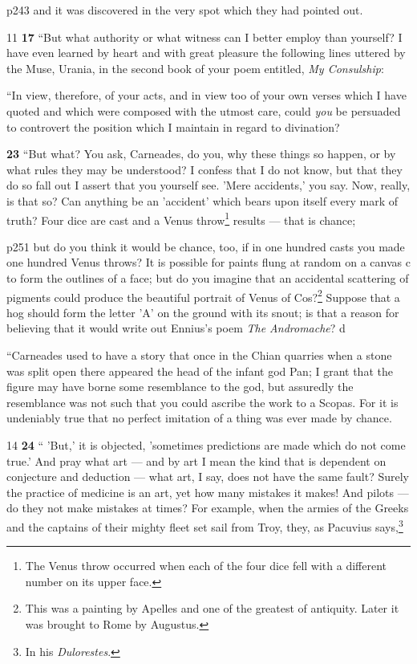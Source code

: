 p243 and it was discovered in the very spot which they had pointed out.

11
\textbf{17} ``But what authority or what witness can I better employ than yourself? I have even learned by heart and with great pleasure the following lines uttered by the Muse, Urania, in the second book of your poem entitled, \emph{My Consulship}:

``In view, therefore, of your acts, and in view too of your own verses which I have quoted and which were composed with the utmost care, could \emph{you} be persuaded to controvert the position which I maintain in regard to divination?

\textbf{23} ``But what? You ask, Carneades, do you, why these things so happen, or by what rules they may be understood? I confess that I do not know, but that they do so fall out I assert that you yourself see. 'Mere accidents,' you say. Now, really, is that so? Can anything be an 'accident' which bears upon itself every mark of truth? Four dice are cast and a Venus throw\texthebrew{}\footnote{The Venus throw occurred when each of the four dice fell with a different number on its upper face.

} results \texthebrew{—} that is chance;

p251 but do you think it would be chance, too, if in one hundred casts you made one hundred Venus throws? It is possible for paints flung at random on a canvas\texthebrew{} c to form the outlines of a face; but do you imagine that an accidental scattering of pigments could produce the beautiful portrait of Venus of Cos?\texthebrew{}\footnote{This was a painting by Apelles and one of the greatest of antiquity. Later it was brought to Rome by Augustus.

} Suppose that a hog should form the letter 'A' on the ground with its snout; is that a reason for believing that it would write out Ennius's poem \emph{The Andromache}?\texthebrew{} d

``Carneades used to have a story that once in the Chian quarries when a stone was split open there appeared the head of the infant god Pan; I grant that the figure may have borne some resemblance to the god, but assuredly the resemblance was not such that you could ascribe the work to a Scopas. For it is undeniably true that no perfect imitation of a thing was ever made by chance.

14
\textbf{24} `` 'But,' it is objected, 'sometimes predictions are made which do not come true.' And pray what art \texthebrew{—} and by art I mean the kind that is dependent on conjecture and deduction \texthebrew{—} what art, I say, does not have the same fault? Surely the practice of medicine is an art, yet how many mistakes it makes! And pilots \texthebrew{—} do they not make mistakes at times? For example, when the armies of the Greeks and the captains of their mighty fleet set sail from Troy, they, as Pacuvius says,\footnote{In his \emph{Dulorestes}.

}

